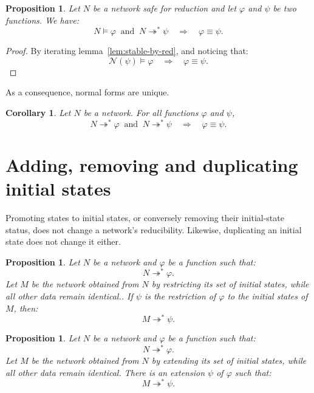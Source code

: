 \documentclass{article}
\newtheorem{proposition}[definition]{Proposition}
\newtheorem{corollary}[definition]{Corollary}
\begin{document}
\begin{proposition} Let $N$ be a network safe for reduction and let $\varphi$ and $\psi$ be two functions. We have:
 \[ N \models \varphi\ \text{ and }\  N\twoheadrightarrow^* \psi\quad \Longrightarrow\quad \varphi\equiv \psi.\] 
\end{proposition}
\begin{proof} 
By iterating lemma~\ref{lem:stable-by-red}, and noticing that:
 \[\mathcal{N}(\psi)\models \varphi\quad \Rightarrow \quad \varphi\equiv \psi.\]\vspace{-10pt}
\end{proof}

As a consequence, normal forms are unique.
\begin{corollary} Let $N$ be a network. For all functions $\varphi$ and $\psi$,
  \[ N \twoheadrightarrow^* \varphi\ \text{ and }\  N\twoheadrightarrow^* \psi\quad \Longrightarrow\quad \varphi\equiv \psi.\]
  \label{cor:unique-normal-form}
\end{corollary}




\section{Adding, removing and duplicating initial states}

Promoting states to initial states, or conversely removing their initial-state status, does not change a network's reducibility. Likewise, duplicating an initial state does not change it either.

\begin{proposition} Let $N$ be a network and $\varphi$ be a function such that:
  \[N\twoheadrightarrow^* \varphi.\]
  Let $M$ be the network obtained from $N$ by restricting its set of initial states, while all other data remain identical.. If $\psi$ is the restriction of $\varphi$ to the initial states of $M$, then:
  \[  M \twoheadrightarrow^* \psi.\] 
\end{proposition}

\begin{proposition} 
  Let $N$ be a network and $\varphi$ be a function such that:
  \[N\twoheadrightarrow^* \varphi.\]
  Let $M$ be the network obtained from $N$ by extending its set of initial states, while all other data remain identical. There is an extension $\psi$ of $\varphi$ such that:
  \[  M \twoheadrightarrow^* \psi.\] 
\end{proposition}
\end{document}
